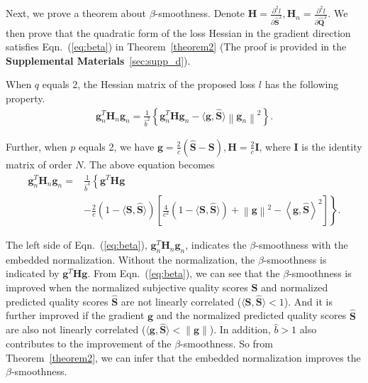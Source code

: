 \documentclass[sigconf]{acmart}
\begin{document}
Next, we prove a theorem about $\beta$-smoothness. 
Denote $\mathbf{H}=\frac{\partial^2 l}{\partial \hat{\mathbf{S}}^2}, \mathbf{H}_n=\frac{\partial^2 l}{\partial \hat{\mathbf{Q}}^2}$. 
We then prove that the quadratic form of the loss Hessian in the gradient direction satisfies Eqn.~(\ref{eq:beta}) in Theorem~\ref{theorem2} (The proof is provided in the \textbf{Supplemental Materials}~\ref{sec:supp_d}). 

\begin{theorem}\label{theorem2}
When $q$ equals 2, the Hessian matrix of the proposed loss $l$ has the following property.
\begin{align}
    {\mathbf{g}}_n^T\mathbf{H}_n{\mathbf{g}}_n = \frac{1}{\hat{b}^2} \left\{{\mathbf{g}}_n^T\mathbf{H}{\mathbf{g}}_n-\langle{\mathbf{g}},\hat{\mathbf{S}}\rangle\left\|{\mathbf{g}}_n\right\|^2\right\}.
\end{align}

Further, when $p$ equals 2, we have ${\mathbf{g}} =\frac{2}{c}(\hat{\mathbf{S}}-{\mathbf{S}}), \mathbf{H}=\frac{2}{c}\mathbf{I}$, where $\mathbf{I}$ is the identity matrix of order $N$. 
The above equation becomes
\begin{align}\label{eq:beta}
    {\mathbf{g}}_n^T\mathbf{H}_n{\mathbf{g}}_n = & \frac{1}{\hat{b}^4} \left\{\mathbf{g}^T\mathbf{H}\mathbf{g}\right. \nonumber\\
    & \left.-\frac{2}{c}\left(1-\langle{\mathbf{S}},\hat{\mathbf{S}}\rangle\right)\left[\frac{4}{c^2}\left(1-\langle{\mathbf{S}},\hat{\mathbf{S}}\rangle\right)+\left\|{\mathbf{g}}\right\|^2-\left\langle{\mathbf{g}},\hat{\mathbf{S}}\right\rangle^2\right]\right\}.
\end{align}

\end{theorem}

The left side of Eqn.~(\ref{eq:beta}), ${\mathbf{g}}_n^T\mathbf{H}_n{\mathbf{g}}_n$, indicates the $\beta$-smoothness with the embedded normalization. 
Without the normalization, the $\beta$-smoothness is indicated by ${\mathbf{g}}^T\mathbf{H}{\mathbf{g}}$. 
From Eqn.~(\ref{eq:beta}), we can see that the $\beta$-smoothness is improved when the normalized subjective quality scores ${\mathbf{S}}$ and normalized predicted quality scores $\hat{\mathbf{S}}$ are not linearly correlated ($\langle{\mathbf{S}},\hat{\mathbf{S}}\rangle<1$). 
And it is further improved if the gradient ${\mathbf{g}}$ and the normalized predicted quality scores $\hat{\mathbf{S}}$ are also not linearly correlated ($\langle{\mathbf{g}},\hat{\mathbf{S}}\rangle<\|{\mathbf{g}}\|$). 
In addition, ${\hat{b}}>1$ also contributes to the improvement of the $\beta$-smoothness. 
So from Theorem~\ref{theorem2}, we can infer that the embedded normalization improves the $\beta$-smoothness.
\end{document}
